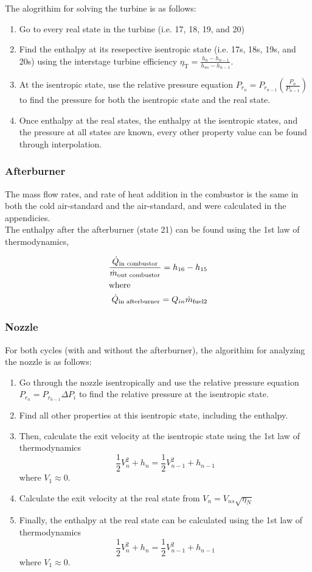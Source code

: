 \documentclass[11pt]{article} %
\begin{document}
\noindent The alogrithim for solving the turbine is as follows: 
\begin{enumerate}
\item Go to every real state in the turbine (i.e. 17, 18, 19, and 20)
\item Find the enthalpy at its resepective isentropic state (i.e. 17s, 18s, 19s, and 20s) using the interstage turbine efficiency $\eta_{\text{T}} = \frac{ h_{n} - h_{n-1} }{h_{ns} - h_{n-1}}$.
\item At the isentropic state, use the relative pressure equation $P_{r_n} = P_{r_{n-1}} \left( \frac{P_{n}}{P_{n-1}} \right)$ to find the pressure for both the isentropic state and the real state.
\item Once enthalpy at the real states, the enthalpy at the isentropic states, and the pressure at all states are known, every other property value can be found through interpolation.
\end{enumerate}


\subsubsection*{Afterburner}
The mass flow rates, and rate of heat addition in the combustor is the same in both the cold air-standard and the air-standard, and were calculated in the appendicies. \\

\noindent The enthalpy after the afterburner (state 21) can be found using the 1st law of thermodynamics,

\begin{align*}
\frac{\dot{Q}_{\text{in combustor}}}{\dot{m}_{\text{out combustor}}} = h_{16} - h_{15} \\ \intertext{where}
\dot{Q}_{\text{in afterburner}} = Q_{in}\dot{m}_{\text{fuel2}}
\end{align*}

\subsubsection*{Nozzle}
For both cycles (with and without the afterburner), the algorithim for analyzing the nozzle is as follows:
\begin{enumerate}
\item Go through the nozzle isentropically and use the relative pressure equation $P_{r_n} = P_{r_{n-1}} \Delta P_i$ to find the relative pressure at the isentropic state.
\item Find all other properties at this isentropic state, including the enthalpy. 
\item Then, calculate the exit velocity at the isentropic state using the 1st law of thermodynamics $$\frac{1}{2}V_{n}^2 + h_n = \frac{1}{2}V_{n-1}^2 + h_{n-1}$$ where $V_1 \approx 0$. 
\item Calculate the exit velocity at the real state from $V_{n} = V_{ns}\sqrt{\eta_N}$
\item Finally, the enthalpy at the real state can be calculated using the 1st law of thermodynamics $$\frac{1}{2}V_{n}^2 + h_n = \frac{1}{2}V_{n-1}^2 + h_{n-1}$$ where $V_1 \approx 0$. 
\end{enumerate}
\end{document}
